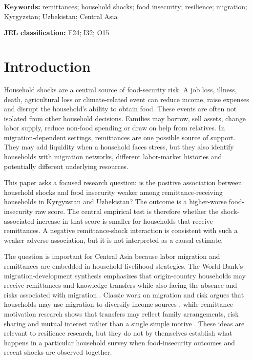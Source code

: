 \documentclass[11pt]{article}
\begin{document}
\noindent\textbf{Keywords:} remittances; household shocks; food insecurity; resilience; migration; Kyrgyzstan; Uzbekistan; Central Asia

\noindent\textbf{JEL classification:} F24; I32; O15

\clearpage

\section{Introduction}

Household shocks are a central source of food-security risk. A job loss, illness, death, agricultural loss or climate-related event can reduce income, raise expenses and disrupt the household's ability to obtain food. These events are often not isolated from other household decisions. Families may borrow, sell assets, change labor supply, reduce non-food spending or draw on help from relatives. In migration-dependent settings, remittances are one possible source of support. They may add liquidity when a household faces stress, but they also identify households with migration networks, different labor-market histories and potentially different underlying resources.

This paper asks a focused research question: is the positive association between household shocks and food insecurity weaker among remittance-receiving households in Kyrgyzstan and Uzbekistan? The outcome is a higher-worse food-insecurity raw score. The central empirical test is therefore whether the shock-associated increase in that score is smaller for households that receive remittances. A negative remittance-shock interaction is consistent with such a weaker adverse association, but it is not interpreted as a causal estimate.

The question is important for Central Asia because labor migration and remittances are embedded in household livelihood strategies. The World Bank's migration-development synthesis emphasizes that origin-country households may receive remittances and knowledge transfers while also facing the absence and risks associated with migration \parencite{WorldBank2023}. Classic work on migration and risk argues that households may use migration to diversify income sources \parencite{StarkLevhari1982}, while remittance-motivation research shows that transfers may reflect family arrangements, risk sharing and mutual interest rather than a single simple motive \parencite{LucasStark1985}. These ideas are relevant to resilience research, but they do not by themselves establish what happens in a particular household survey when food-insecurity outcomes and recent shocks are observed together.
\end{document}
